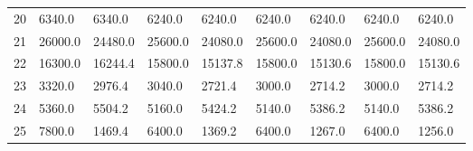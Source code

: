\begin{tabular}{|r|l|l|l|l|l|l|l|l|}
  20 & 6340.0 & 6340.0 & 6240.0 & 6240.0 & 6240.0 & 6240.0 & 6240.0 & 6240.0 \\ 
  21 & 26000.0 & 24480.0 & 25600.0 & 24080.0 & 25600.0 & 24080.0 & 25600.0 & 24080.0 \\ 
  22 & 16300.0 & 16244.4 & 15800.0 & 15137.8 & 15800.0 & 15130.6 & 15800.0 & 15130.6 \\ 
  23 & 3320.0 & 2976.4 & 3040.0 & 2721.4 & 3000.0 & 2714.2 & 3000.0 & 2714.2 \\ 
  24 & 5360.0 & 5504.2 & 5160.0 & 5424.2 & 5140.0 & 5386.2 & 5140.0 & 5386.2 \\ 
  25 & 7800.0 & 1469.4 & 6400.0 & 1369.2 & 6400.0 & 1267.0 & 6400.0 & 1256.0 \\ 
\end{tabular}
